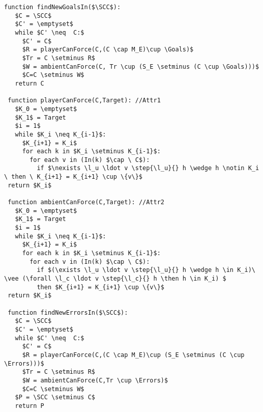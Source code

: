 \begin{lstlisting}[language={pseudocode},label={lst:dcs.gather},caption={Status confirmation.},float=ht]
 function findNewGoalsIn($\SCC$):
   $C = \SCC$
   $C' = \emptyset$
   while $C' \neq  C:$
     $C' = C$
     $R = playerCanForce(C,(C \cap M_E)\cup \Goals)$
     $Tr = C \setminus R$
     $W = ambientCanForce(C, Tr \cup (S_E \setminus (C \cup \Goals)))$
     $C=C \setminus W$
   return C
  
 function playerCanForce(C,Target): //Attr1
   $K_0 = \emptyset$
   $K_1$ = Target
   $i = 1$
   while $K_i \neq K_{i-1}$:
     $K_{i+1} = K_i$
     for each k in $K_i \setminus K_{i-1}$:
       for each v in (In(k) $\cap \ C$):
         if $\nexists \l_u \ldot v \step{\l_u}{} h \wedge h \notin K_i \ then \ K_{i+1} = K_{i+1} \cup \{v\}$
 return $K_i$

 function ambientCanForce(C,Target): //Attr2
   $K_0 = \emptyset$
   $K_1$ = Target
   $i = 1$
   while $K_i \neq K_{i-1}$:
     $K_{i+1} = K_i$
     for each k in $K_i \setminus K_{i-1}$:
       for each v in (In(k) $\cap \ C$):
         if $(\exists \l_u \ldot v \step{\l_u}{} h \wedge h \in K_i)\ \vee (\forall \l_c \ldot v \step{\l_c}{} h \then h \in K_i) $
         then $K_{i+1} = K_{i+1} \cup \{v\}$
 return $K_i$
  
 function findNewErrorsIn($\SCC$):
   $C = \SCC$
   $C' = \emptyset$
   while $C' \neq  C:$
     $C' = C$
     $R = playerCanForce(C,(C \cap M_E)\cup (S_E \setminus (C \cup \Errors)))$
     $Tr = C \setminus R$
     $W = ambientCanForce(C,Tr \cup \Errors)$
     $C=C \setminus W$
   $P = \SCC \setminus C$
   return P
\end{lstlisting}

